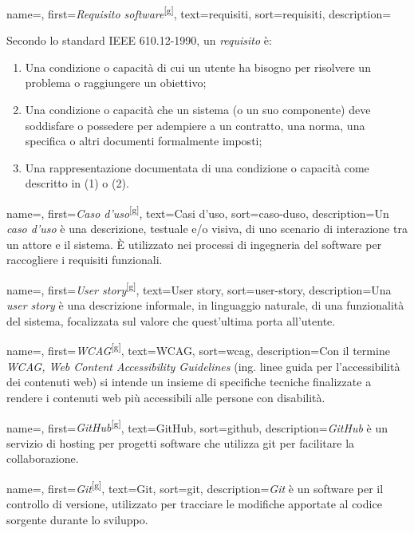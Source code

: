  {
    name=,
    first={\textit{Requisito software}\textsuperscript{[g]}},
    text=requisiti,
    sort=requisiti,
    description={Secondo lo standard IEEE 610.12-1990, un \emph{requisito} è:
    \begin{enumerate}
        \item Una condizione o capacità di cui un utente ha bisogno per risolvere un problema o raggiungere un obiettivo;
        \item Una condizione o capacità che un sistema (o un suo componente) deve soddisfare o possedere per adempiere a un contratto, una norma, una specifica o altri documenti formalmente imposti;
        \item Una rappresentazione documentata di una condizione o capacità come descritto in (1) o (2).
    \end{enumerate}
    }
}

 {
    name=,
    first={\textit{Caso d'uso}\textsuperscript{[g]}},
    text=Casi d'uso,
    sort=caso-duso,
    description={Un \emph{caso d'uso} è una descrizione, testuale e/o visiva, di uno scenario di interazione tra un attore e il sistema. È utilizzato nei processi di ingegneria del software per raccogliere i requisiti funzionali.}
}

 {
    name=,
    first={\textit{User story}\textsuperscript{[g]}},
    text=User story,
    sort=user-story,
    description={Una \emph{user story} è una descrizione informale, in linguaggio naturale, di una funzionalità del sistema, focalizzata sul valore che quest'ultima porta all'utente.}
}

 {
    name=,
    first={\textit{WCAG}\textsuperscript{[g]}},
    text=WCAG,
    sort=wcag,
    description={Con il termine \emph{WCAG, Web Content Accessibility Guidelines} (ing. linee guida per l'accessibilità dei contenuti web) si intende un insieme di specifiche tecniche finalizzate a rendere i contenuti web più accessibili alle persone con disabilità.}
}

 {
    name=,
    first={\textit{GitHub}\textsuperscript{[g]}},
    text=GitHub,
    sort=github,
    description={\emph{GitHub} è un servizio di hosting per progetti software che utilizza \gls{git} per facilitare la collaborazione.}
}

 {
    name=,
    first={\textit{Git}\textsuperscript{[g]}},
    text=Git,
    sort=git,
    description={\emph{Git} è un software per il controllo di versione, utilizzato per tracciare le modifiche apportate al codice sorgente durante lo sviluppo.}
}

